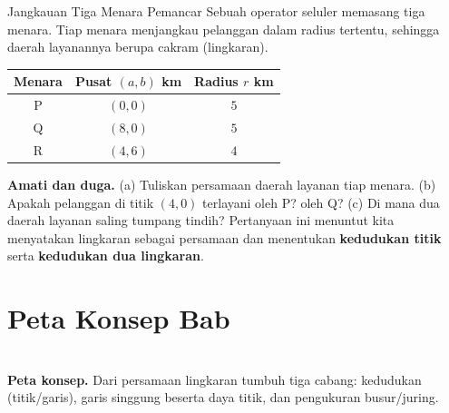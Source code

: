 \documentclass[11pt,a4paper]{report}
\theoremstyle{gaya}
\begin{document}
\begin{studikasus}{Jangkauan Tiga Menara Pemancar}
Sebuah operator seluler memasang tiga menara. Tiap menara menjangkau pelanggan dalam radius tertentu, sehingga daerah layanannya berupa cakram (lingkaran).
\begin{center}
\begin{tabular}{c|c|c}
\toprule
Menara & Pusat $(a,b)$ km & Radius $r$ km \\
\midrule
P & $(0,0)$ & $5$ \\
Q & $(8,0)$ & $5$ \\
R & $(4,6)$ & $4$ \\
\bottomrule
\end{tabular}
\end{center}
\textbf{Amati dan duga.} (a) Tuliskan persamaan daerah layanan tiap menara. (b) Apakah pelanggan di titik $(4,0)$ terlayani oleh P? oleh Q? (c) Di mana dua daerah layanan saling tumpang tindih? Pertanyaan ini menuntut kita menyatakan lingkaran sebagai persamaan dan menentukan \textbf{kedudukan titik} serta \textbf{kedudukan dua lingkaran}.
\end{studikasus}

\section*{Peta Konsep Bab}
\begin{center}
\\
\small \textbf{Peta konsep.} Dari persamaan lingkaran tumbuh tiga cabang: kedudukan (titik/garis), garis singgung beserta daya titik, dan pengukuran busur/juring.
\end{center}
\end{document}
